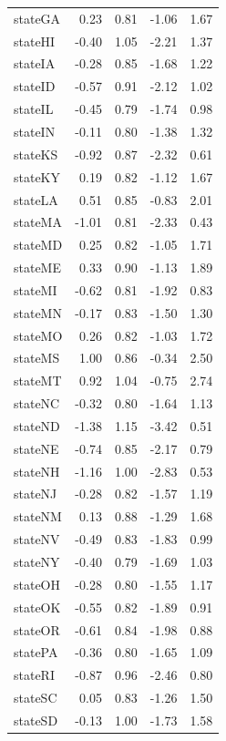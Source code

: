 \documentclass[
  letterpaper,
  DIV=11,
  numbers=noendperiod]{scrartcl}
\begin{document}
\begin{longtable}[t]{lrrrr}
stateGA & 0.23 & 0.81 & -1.06 & 1.67\\
stateHI & -0.40 & 1.05 & -2.21 & 1.37\\
stateIA & -0.28 & 0.85 & -1.68 & 1.22\\
stateID & -0.57 & 0.91 & -2.12 & 1.02\\
\addlinespace
stateIL & -0.45 & 0.79 & -1.74 & 0.98\\
stateIN & -0.11 & 0.80 & -1.38 & 1.32\\
stateKS & -0.92 & 0.87 & -2.32 & 0.61\\
stateKY & 0.19 & 0.82 & -1.12 & 1.67\\
stateLA & 0.51 & 0.85 & -0.83 & 2.01\\
\addlinespace
stateMA & -1.01 & 0.81 & -2.33 & 0.43\\
stateMD & 0.25 & 0.82 & -1.05 & 1.71\\
stateME & 0.33 & 0.90 & -1.13 & 1.89\\
stateMI & -0.62 & 0.81 & -1.92 & 0.83\\
stateMN & -0.17 & 0.83 & -1.50 & 1.30\\
\addlinespace
stateMO & 0.26 & 0.82 & -1.03 & 1.72\\
stateMS & 1.00 & 0.86 & -0.34 & 2.50\\
stateMT & 0.92 & 1.04 & -0.75 & 2.74\\
stateNC & -0.32 & 0.80 & -1.64 & 1.13\\
stateND & -1.38 & 1.15 & -3.42 & 0.51\\
\addlinespace
stateNE & -0.74 & 0.85 & -2.17 & 0.79\\
stateNH & -1.16 & 1.00 & -2.83 & 0.53\\
stateNJ & -0.28 & 0.82 & -1.57 & 1.19\\
stateNM & 0.13 & 0.88 & -1.29 & 1.68\\
stateNV & -0.49 & 0.83 & -1.83 & 0.99\\
\addlinespace
stateNY & -0.40 & 0.79 & -1.69 & 1.03\\
stateOH & -0.28 & 0.80 & -1.55 & 1.17\\
stateOK & -0.55 & 0.82 & -1.89 & 0.91\\
stateOR & -0.61 & 0.84 & -1.98 & 0.88\\
statePA & -0.36 & 0.80 & -1.65 & 1.09\\
\addlinespace
stateRI & -0.87 & 0.96 & -2.46 & 0.80\\
stateSC & 0.05 & 0.83 & -1.26 & 1.50\\
stateSD & -0.13 & 1.00 & -1.73 & 1.58\\

\end{longtable}
\end{document}
